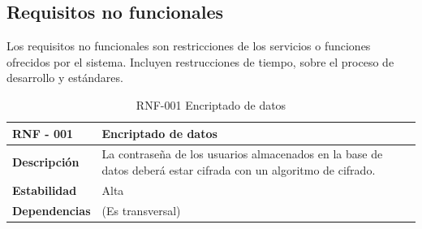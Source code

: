 \subsection{Requisitos no funcionales}


Los requisitos no funcionales son restricciones de los servicios o funciones ofrecidos por el sistema. Incluyen restrucciones de tiempo, sobre el proceso de desarrollo y estándares\cite{sommerville}.

\begin{table}[htpb]
\centering
\begin{tabularx}{\textwidth}{|l|X|}
\hline
\textbf{RNF - 001}                               & \textbf{Encriptado de datos}                                                                                            \\ \hline
\textbf{Descripción}                             & La contraseña de los usuarios almacenados en la base de datos deberá estar cifrada con un algoritmo de cifrado. \\ \hline
\textbf{Estabilidad}                             & Alta                                                                                                           \\ \hline
\textbf{Dependencias} & (Es transversal)                                                                                               \\ \hline
\end{tabularx}
\caption{RNF-001 Encriptado de datos}                                                                                                                                                                                                                                                                      
\end{table}

\clearpage

